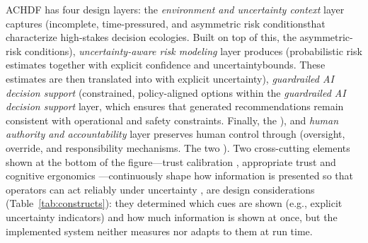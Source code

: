 \documentclass[journal]{IEEEtran}
\theoremstyle{plain}
\theoremstyle{definition}
\providecommand{\DIFaddtex}[1]{{\protect\color{blue} \sf #1}} %
\providecommand{\DIFdeltex}[1]{{\protect\color{red} \scriptsize #1}} %
\providecommand{\DIFaddbegin}{} %
\providecommand{\DIFaddend}{} %
\providecommand{\DIFdelbegin}{} %
\providecommand{\DIFdelend}{} %
\providecommand{\DIFadd}[1]{\texorpdfstring{\DIFaddtex{#1}}{#1}} %
\providecommand{\DIFdel}[1]{\texorpdfstring{\DIFdeltex{#1}}{}} %
\newcommand{\DIFscaledelfig}{0.5}
\newlength{\DIFdelgraphicswidth} %
\newlength{\DIFdelgraphicsheight} %
\newcommand{\DIFaddincludegraphics}[2][]{{\color{blue}\fbox{\DIFOincludegraphics[#1]{#2}}}} %
\newcommand{\DIFdelincludegraphics}[2][]{%
\sbox{\DIFdelgraphicsbox}{\DIFOincludegraphics[#1]{#2}}%
\settoboxwidth{\DIFdelgraphicswidth}{\DIFdelgraphicsbox} %
\settoboxtotalheight{\DIFdelgraphicsheight}{\DIFdelgraphicsbox} %
\scalebox{\DIFscaledelfig}{%
\parbox[b]{\DIFdelgraphicswidth}{\usebox{\DIFdelgraphicsbox}\\[-\baselineskip] \rule{\DIFdelgraphicswidth}{0em}}\llap{\resizebox{\DIFdelgraphicswidth}{\DIFdelgraphicsheight}{%
\setlength{\unitlength}{\DIFdelgraphicswidth}%
\begin{picture}(1,1)%
\thicklines\linethickness{2pt} %
{\color[rgb]{1,0,0}\put(0,0){\framebox(1,1){}}}%
{\color[rgb]{1,0,0}\put(0,0){\line( 1,1){1}}}%
{\color[rgb]{1,0,0}\put(0,1){\line(1,-1){1}}}%
\end{picture}%
}\hspace*{3pt}}} %
} %
\DeclareRobustCommand{\DIFaddbegin}{\DIFOaddbegin \let\includegraphics\DIFaddincludegraphics} %
\DeclareRobustCommand{\DIFaddend}{\DIFOaddend \let\includegraphics\DIFOincludegraphics} %
\DeclareRobustCommand{\DIFdelbegin}{\DIFOdelbegin \let\includegraphics\DIFdelincludegraphics} %
\DeclareRobustCommand{\DIFdelend}{\DIFOaddend \let\includegraphics\DIFOincludegraphics} %
\begin{document}
    \DIFadd{ACHDF has four design layers: the }\DIFaddend \emph{environment and uncertainty context} \DIFdelbegin \DIFdel{layer captures }\DIFdelend \DIFaddbegin \DIFadd{(}\DIFaddend incomplete, time-pressured, \DIFdelbegin \DIFdel{and asymmetric risk conditionsthat characterize high-stakes decision ecologies. Built on top of this, the }\DIFdelend \DIFaddbegin \DIFadd{asymmetric-risk conditions), }\DIFaddend \emph{uncertainty-aware risk modeling} \DIFdelbegin \DIFdel{layer produces }\DIFdelend \DIFaddbegin \DIFadd{(}\DIFaddend probabilistic risk estimates \DIFdelbegin \DIFdel{together with explicit confidence and uncertaintybounds. These estimates are then translated into }\DIFdelend \DIFaddbegin \DIFadd{with explicit uncertainty), \emph{guardrailed AI decision support} (}\DIFaddend constrained, policy-aligned options\DIFdelbegin \DIFdel{within the \emph{guardrailed AI decision support} layer, which ensures that generated recommendations remain consistent with operational and safety constraints. Finally, the }\DIFdelend \DIFaddbegin \DIFadd{), and }\DIFaddend \emph{human authority and accountability} \DIFdelbegin \DIFdel{layer preserves human control through }\DIFdelend \DIFaddbegin \DIFadd{(}\DIFaddend oversight, override, and responsibility\DIFdelbegin \DIFdel{mechanisms. The two }\DIFdelend \DIFaddbegin \DIFadd{). Two }\DIFaddend cross-cutting elements\DIFdelbegin \DIFdel{shown at the bottom of the figure—trust calibration }\DIFdelend \DIFaddbegin \DIFadd{, appropriate trust \cite{Lee2004} }\DIFaddend and cognitive ergonomics\DIFdelbegin \DIFdel{—continuously shape how information is presented so that operators can act reliably under uncertainty}\DIFdelend \DIFaddbegin \DIFadd{, are design considerations (Table~\ref{tab:constructs}): they determined which cues are shown (e.g., explicit uncertainty indicators) and how much information is shown at once, but the implemented system neither measures nor adapts to them at run time}\DIFaddend .
\end{document}
